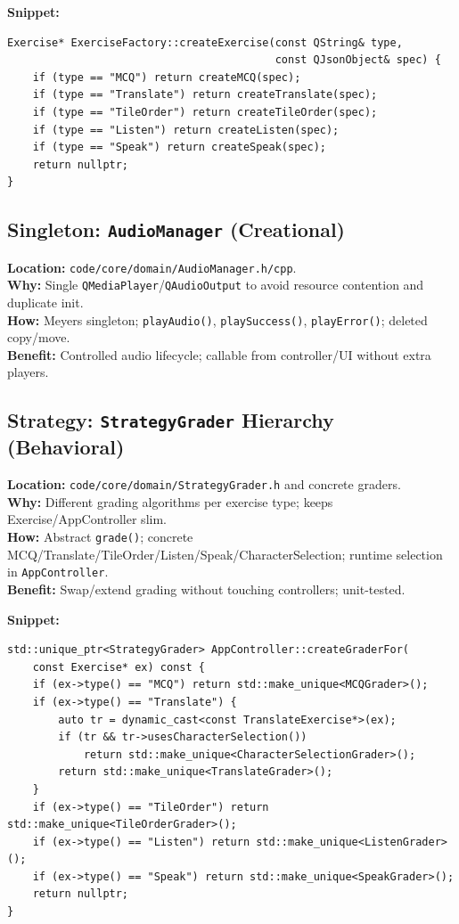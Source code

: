 \documentclass{article}
\begin{document}
\noindent\textbf{Snippet:}
\begin{lstlisting}[caption={Factory dispatch}, captionpos=b]
Exercise* ExerciseFactory::createExercise(const QString& type,
                                          const QJsonObject& spec) {
    if (type == "MCQ") return createMCQ(spec);
    if (type == "Translate") return createTranslate(spec);
    if (type == "TileOrder") return createTileOrder(spec);
    if (type == "Listen") return createListen(spec);
    if (type == "Speak") return createSpeak(spec);
    return nullptr;
}
\end{lstlisting}

\subsection{Singleton: \texttt{AudioManager} (Creational)}
\textbf{Location:} \texttt{code/core/domain/AudioManager.h/cpp}.\\
\textbf{Why:} Single \texttt{QMediaPlayer}/\texttt{QAudioOutput} to avoid resource contention and duplicate init.\\
\textbf{How:} Meyers singleton; \texttt{playAudio()}, \texttt{playSuccess()}, \texttt{playError()}; deleted copy/move.\\
\textbf{Benefit:} Controlled audio lifecycle; callable from controller/UI without extra players.

\subsection{Strategy: \texttt{StrategyGrader} Hierarchy (Behavioral)}
\textbf{Location:} \texttt{code/core/domain/StrategyGrader.h} and concrete graders.\\
\textbf{Why:} Different grading algorithms per exercise type; keeps Exercise/AppController slim.\\
\textbf{How:} Abstract \texttt{grade()}; concrete MCQ/Translate/TileOrder/Listen/Speak/CharacterSelection; runtime selection in \texttt{AppController}.\\
\textbf{Benefit:} Swap/extend grading without touching controllers; unit-tested.

\noindent\textbf{Snippet:}
\begin{lstlisting}[caption={Runtime strategy selection}, captionpos=b]
std::unique_ptr<StrategyGrader> AppController::createGraderFor(
    const Exercise* ex) const {
    if (ex->type() == "MCQ") return std::make_unique<MCQGrader>();
    if (ex->type() == "Translate") {
        auto tr = dynamic_cast<const TranslateExercise*>(ex);
        if (tr && tr->usesCharacterSelection())
            return std::make_unique<CharacterSelectionGrader>();
        return std::make_unique<TranslateGrader>();
    }
    if (ex->type() == "TileOrder") return std::make_unique<TileOrderGrader>();
    if (ex->type() == "Listen") return std::make_unique<ListenGrader>();
    if (ex->type() == "Speak") return std::make_unique<SpeakGrader>();
    return nullptr;
}
\end{lstlisting}
\end{document}

